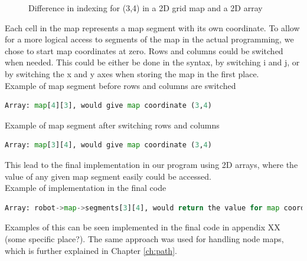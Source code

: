 \begin{figure}[htp]
    \centering
    \hspace{0.05\textwidth}  
    \caption{Difference in indexing for (3,4) in a 2D grid map and a 2D array}
    \label{fig:floor_plans}
\end{figure}

Each cell in the map represents a map segment with its own coordinate. To allow for a more logical access to segments of the map in the actual programming, we chose to start map coordinates at zero. Rows and columns could be switched when needed. This could be either be done in the syntax, by switching i and j, or by switching the x and y axes when storing the map in the first place.
\\

Example of map segment before rows and columns are switched
\begin{lstlisting}[language=Python]
Array: map[4][3], would give map coordinate (3,4)
\end{lstlisting}

Example of map segment after switching rows and columns
\begin{lstlisting}[language=Python]
Array: map[3][4], would give map coordinate (3,4)
\end{lstlisting}

This lead to the final implementation in our program using 2D arrays, 
where the value of any given map segment easily could be accessed. 
\\
Example of implementation in the final code
\begin{lstlisting}[language=Python]
Array: robot->map->segments[3][4], would return the value for map coordinate (3,4)
\end{lstlisting}
Examples of this can be seen implemented in the final code in appendix XX (some specific place?). 
The same approach was used for handling node maps, which is further explained in Chapter \ref{ch:path}.


